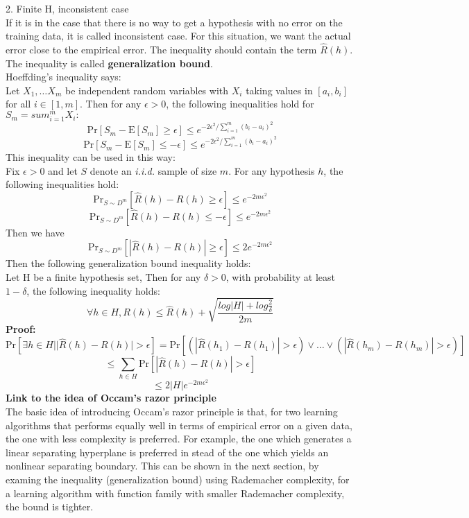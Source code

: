 \documentclass[12pt]{article}
\theoremstyle{definition}
\theoremstyle{remark}
\numberwithin{equation}{section}
\begin{document}
2. Finite H, inconsistent case\\[0.2cm]
If it is in the case that there is no way to get a hypothesis with no error on the training data, it is called inconsistent case. For this situation, we want the actual error close to the empirical error. The inequality should contain the term $\widehat{R}(h)$. The inequality is called \textbf{generalization bound}.\\[0.2cm]
Hoeffding's inequality says:\\[0.2cm]
Let $X_1,\dots X_m$ be independent random variables with $X_i$ taking values in $[a_i,b_i]$ for all $i\in[1,m]$. Then for any $\epsilon > 0$, the following inequalities hold for $S_m = sum_{i=1}^m X_i:$
\[\text{Pr}[S_m-\text{E}[S_m] \geq \epsilon] \leq e^{-2\epsilon^2 / \sum_{i=1}^m(b_i-a_i)^2}\]
\[\text{Pr}[S_m-\text{E}[S_m] \leq -\epsilon] \leq e^{-2\epsilon^2 / \sum_{i=1}^m(b_i-a_i)^2}\]
This inequality can be used in this way:\\[0.2cm]
Fix $\epsilon >0$ and let $S$ denote an \emph{i.i.d.} sample of size $m$. For any hypothesis $h$, the following inequalities hold:
\[\text{Pr}_{S\sim D^m}[\widehat{R}(h) - R(h) \geq \epsilon] \leq e^{-2m\epsilon^2}\]
\[\text{Pr}_{S\sim D^m}[\widehat{R}(h) - R(h) \leq -\epsilon] \leq e^{-2m\epsilon^2}\]
Then we have
\[\text{Pr}_{S\sim D^m}[|\widehat{R}(h) - R(h)| \geq \epsilon] \leq 2 e^{-2m\epsilon^2}\]
Then the following generalization bound inequality holds:\\[0.2cm]
Let H be a finite hypothesis set, Then for any $\delta > 0$, with probability at least $1-\delta$, the following inequality holds:
\[\forall h \in H, R(h) \leq \widehat{R}(h) + \sqrt{\frac{log|H|+log\frac{2}{\delta}}{2m}}\]
\textbf{Proof:}
\[\text{Pr}[\exists h \in H | |\widehat{R}(h) - R(h)|>\epsilon] = \text{Pr}[(|\widehat{R}(h_1)-R(h_1)| > \epsilon)\vee \dots \vee (|\widehat{R}(h_m)-R(h_m)| > \epsilon)]\]
\[\leq \sum_{h\in H}\text{Pr}[|\widehat{R}(h)-R(h)|> \epsilon]\]
\[\leq 2|H|e^{-2m\epsilon^2}\]
\textbf{Link to the idea of Occam's razor principle}\\[0.2cm]
The basic idea of introducing Occam's razor principle is that, for two learning algorithms that performs equally well in terms of empirical error on a given data, the one with less complexity is preferred. For example, the one which generates a linear separating hyperplane is preferred in stead of the one which yields an nonlinear separating boundary. This can be shown in the next section, by examing the inequality (generalization bound) using Rademacher complexity, for a learning algorithm with function family with smaller Rademacher complexity, the bound is tighter.
\end{document}

